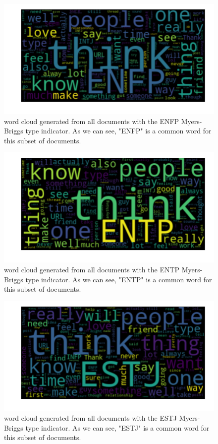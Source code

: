 \begin{figure}[htp] 
  \caption{word cloud generated from all documents with the ENFP Myers-Briggs type indicator. As we can see, "ENFP" is a common word for this subset of documents.}
  \label{fig:wordcloud-ENFP}
  \includegraphics[scale=0.65]{wordclouds/wordcloud_ENFP.pdf}
\end{figure}

\begin{figure}[htp] 
  \caption{word cloud generated from all documents with the ENTP Myers-Briggs type indicator. As we can see, "ENTP" is a common word for this subset of documents.}
  \label{fig:wordcloud-ENTP}
  \includegraphics[scale=0.65]{wordclouds/wordcloud_ENTP.pdf}
\end{figure}

\begin{figure}[htp] 
  \caption{word cloud generated from all documents with the ESTJ Myers-Briggs type indicator. As we can see, "ESTJ" is a common word for this subset of documents.}
  \label{fig:wordcloud-ESTJ}
  \includegraphics[scale=0.65]{wordclouds/wordcloud_ESTJ.pdf}
\end{figure}

